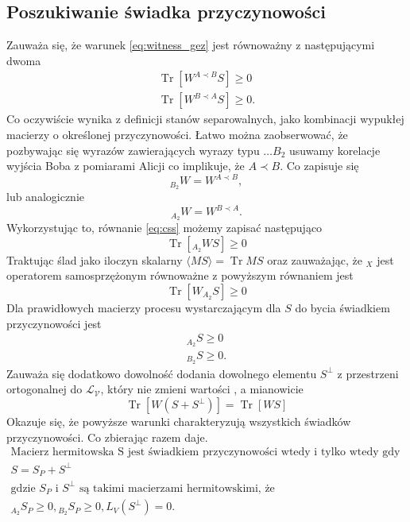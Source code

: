 \documentclass[10pt]{article} %
\DeclareMathOperator{\Trs}{Tr}
\begin{document}
\subsection{Poszukiwanie świadka przyczynowości}
Zauważa się, że warunek \eqref{eq:witness_gez} jest równoważny z następującymi dwoma
\begin{gather}
\label{eq:css2}
\Trs \left[ W^{A \prec B} S\right] \geq 0 \\
\label{eq:css}
\Trs \left[ W^{B \prec A} S\right] \geq 0.
\end{gather}
Co oczywiście wynika z definicji stanów separowalnych, jako kombinacji wypukłej macierzy o określonej przyczynowości.
Łatwo można zaobserwować, że pozbywając się wyrazów zawierających wyrazy typu $\dots B_2$ usuwamy korelacje wyjścia Boba z pomiarami Alicji co
implikuje, że $A \prec B$. Co zapisuje się
\begin{equation}
{}_{B_2} W = W^{A \prec B},
\end{equation}
lub analogicznie
\begin{equation}
{}_{A_2} W = W^{B \prec A}.
\end{equation}
Wykorzystując to, równanie \eqref{eq:css} możemy zapisać następująco
\begin{equation}
\Trs \left[ {}_{A_2} W S\right] \geq 0
\end{equation}
Traktując ślad jako iloczyn skalarny $\langle M S \rangle = \Trs MS$ oraz zauważając, że ${}_X$ jest operatorem samosprzężonym równoważne z powyższym
równaniem jest
\begin{equation}
\Trs \left[ W {}_{A_2}S \right] \geq 0
\end{equation}
Dla prawidłowych macierzy procesu wystarczającym dla $S$ do bycia świadkiem przyczynowości jest 
\begin{gather}
{}_{A_2} S \geq 0 \\
{}_{B_2} S \geq 0.
\end{gather}
Zauważa się dodatkowo dowolność dodania dowolnego elementu $S^\bot$ z przestrzeni ortogonalnej do $\mathcal{L_V}$, który nie zmieni wartości \label{eq:witness_gez}, a mianowicie
\begin{equation}
\Trs\left[W\left(S + S^\bot\right)\right] = \Trs\left[WS\right]
\end{equation}
Okazuje się, że powyższe warunki charakteryzują wszystkich świadków przyczynowości.
Co zbierając razem daje.
\begin{gather}
\text{Macierz hermitowska S jest świadkiem przyczynowości wtedy i tylko wtedy gdy da się ją zapisać, jako} \\
S = S_P + S^\bot \\
\text{gdzie $S_P$ i $S^\bot$ są takimi macierzami hermitowskimi, że} \\ 
{}_{A_2} S_P \geq 0, {}_{B_2} S_P \geq 0, L_V(S^\bot) = 0.
\end{gather}
\end{document}
